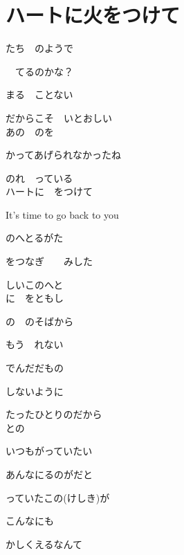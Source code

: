 \section{ ハートに火をつけて}

\large{

たち　のようで

　てるのかな？

まる　ことない　

だからこそ　いとおしい
\\

あの　のを

かってあげられなかったね

のれ　っている
\\

ハートに　をつけて

It's time to go back to you

のへとるがた

をつなぎ　　みした

しいこのへと
\\

に　をともし

の　のそばから

もう　れない

でんだだもの

しないように

たったひとりのだから
\\

との

いつもがっていたい

あんなにるのがだと

っていたこの(けしき)が

こんなにも

かしくえるなんて
\\

}
